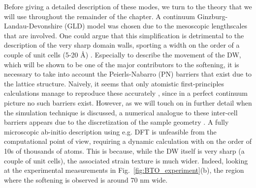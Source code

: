 Before giving a detailed description of these modes, we turn to the theory that we will use throughout the remainder of the chapter. 
A continuum Ginzburg-Landau-Devonshire (GLD) model \cite{Zhirnov1959,L.N.Bulaevskii1963,Marton2010} was chosen due to the mesoscopic lengthscales that are involved.
One could argue that this simplification is detrimental to the description of the very sharp domain walls, sporting a width on the order of a couple of unit cells (5-20 \AA) \cite{Zhirnov1959}.
Especially to describe the movement of the DW, which will be shown to be one of the major contributors to the softening, it is necessary to take into account the Peierls-Nabarro (PN) barriers that exist due to the lattice structure.
Naively, it seems that only atomistic first-principles calculations manage to reproduce these accurately \cite{Meyer2002}, since in a perfect continuum picture no such barriers exist.
However, as we will touch on in further detail when the simulation technique is discussed, a numerical analogue to these inter-cell barriers appears due to the discretization of the sample geometry \cite{Marton2018}.  
A fully microscopic ab-initio description using e.g. DFT is unfeasible from the computational point of view, requiring a dynamic calculation with on the order of 10s of thousands of atoms.
This is because, while the DW itself is very sharp (a couple of unit cells), the associated strain texture is much wider.
Indeed, looking at the experimental measurements in Fig.~\ref{fig:BTO_experiment}(b), the region where the softening is observed is around 70 nm wide.

